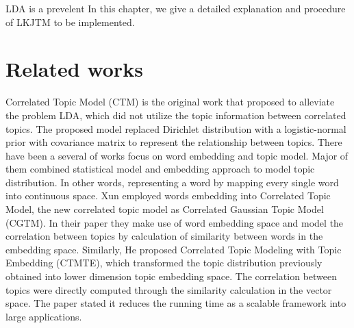 LDA is a prevelent 
In this chapter, we give a detailed explanation and procedure of LKJTM to be implemented.
\section{Related works}
Correlated Topic Model (CTM)\cite{blei_correlated_2007} is the original work that proposed to alleviate the problem LDA, which did not utilize the topic information between correlated topics. The proposed model replaced Dirichlet distribution with a logistic-normal prior with covariance matrix to represent the relationship between topics.
There have been a several of works focus on word embedding and topic model. Major of them combined statistical model and embedding approach to model topic distribution. In other words, representing a word by mapping every single word into continuous space.
Xun \cite{xun_correlated_2017} employed words embedding into Correlated Topic Model, the new correlated topic model as Correlated Gaussian Topic Model (CGTM). In their paper they make use of word embedding space and model the correlation between topics by calculation of similarity between words in the embedding space.
Similarly, He\cite{he_efficient_2017} proposed Correlated Topic Modeling with Topic Embedding (CTMTE), which transformed the topic distribution previously obtained into lower dimension topic embedding space. The correlation between topics were directly computed through the similarity calculation in the vector space. The paper stated it reduces the running time as a scalable framework into large applications.
